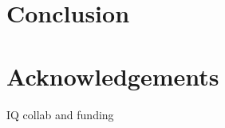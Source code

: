 \documentclass[fleqn,usenatbib]{mnras}
\begin{document}
\section{Conclusion}


\section*{Acknowledgements}
IQ collab and funding













\bsp	%
\label{lastpage}
\end{document}
